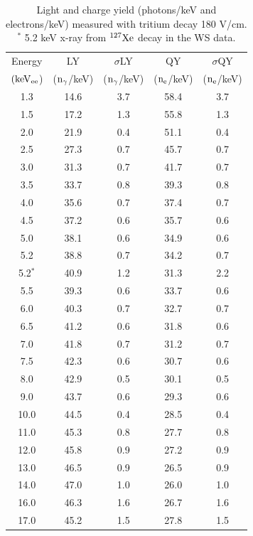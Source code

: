 \begin{table}[h!]
\centering
\begin{tabular}{|c|c|c|c|c|} \hline
Energy 	& 		LY	& 	$\sigma$LY & QY  & $\sigma$QY \\ 
$\rm (keV_{ee}$) & ($\rm n_\gamma$/keV) 	& ($\rm n_\gamma$/keV) & ($\rm n_e$/keV) & ($\rm n_e$/keV) \\ \hline
1.3 	 & 14.6 	 & 3.7 	 & 58.4 	 & 3.7 \\ \hline 
1.5 	 & 17.2 	 & 1.3 	 & 55.8 	 & 1.3 \\ \hline 
2.0 	 & 21.9 	 & 0.4 	 & 51.1 	 & 0.4 \\ \hline 
2.5 	 & 27.3 	 & 0.7 	 & 45.7 	 & 0.7 \\ \hline 
3.0 	 & 31.3 	 & 0.7 	 & 41.7 	 & 0.7 \\ \hline 
3.5 	 & 33.7 	 & 0.8 	 & 39.3 	 & 0.8 \\ \hline 
4.0 	 & 35.6 	 & 0.7 	 & 37.4 	 & 0.7 \\ \hline 
4.5 	 & 37.2 	 & 0.6 	 & 35.7 	 & 0.6 \\ \hline 
5.0 	 & 38.1 	 & 0.6 	 & 34.9 	 & 0.6 \\ \hline 
5.2 	 & 38.8 	 & 0.7 	 & 34.2 	 & 0.7 \\ \hline \hline
5.2$^*$ 	 & 40.9 	 & 1.2 	 & 31.3	 & 2.2 \\ \hline \hline
5.5 	 & 39.3 	 & 0.6 	 & 33.7 	 & 0.6 \\ \hline 
6.0 	 & 40.3 	 & 0.7 	 & 32.7 	 & 0.7 \\ \hline 
6.5 	 & 41.2 	 & 0.6 	 & 31.8 	 & 0.6 \\ \hline 
7.0 	 & 41.8 	 & 0.7 	 & 31.2 	 & 0.7 \\ \hline 
7.5 	 & 42.3 	 & 0.6 	 & 30.7 	 & 0.6 \\ \hline 
8.0 	 & 42.9 	 & 0.5 	 & 30.1 	 & 0.5 \\ \hline 
9.0 	 & 43.7 	 & 0.6 	 & 29.3 	 & 0.6 \\ \hline 
10.0 	 & 44.5 	 & 0.4 	 & 28.5 	 & 0.4 \\ \hline 
11.0 	 & 45.3 	 & 0.8 	 & 27.7 	 & 0.8 \\ \hline 
12.0 	 & 45.8 	 & 0.9 	 & 27.2 	 & 0.9 \\ \hline 
13.0 	 & 46.5 	 & 0.9 	 & 26.5 	 & 0.9 \\ \hline 
14.0 	 & 47.0 	 & 1.0 	 & 26.0 	 & 1.0 \\ \hline 
16.0 	 & 46.3 	 & 1.6 	 & 26.7 	 & 1.6 \\ \hline 
17.0 	 & 45.2 	 & 1.5 	 & 27.8 	 & 1.5 \\ \hline 
\end{tabular}
\caption{Light and charge yield (photons/keV and electrons/keV) measured with tritium decay 180 V/cm. $^*$ 5.2 keV x-ray from $\rm ^{127}Xe$ decay in the WS data.}
\label{table:Yields}
\end{table}

